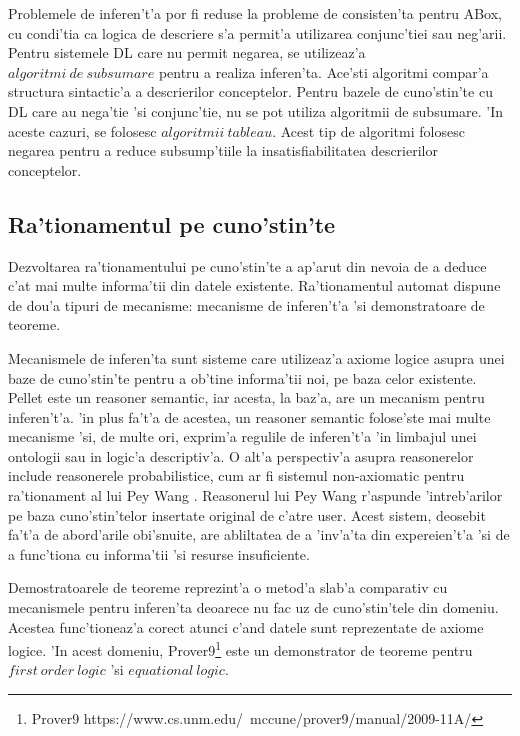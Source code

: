 \documentclass[12pt,a4paper,twoside]{report}
\begin{document}
Problemele de inferen't'a por fi reduse la probleme de consisten'ta pentru ABox, cu condi'tia ca logica de descriere s'a permit'a utilizarea conjunc'tiei sau neg'arii. Pentru sistemele DL care nu permit negarea, se utilizeaz'a $algoritmi\ de\ subsumare$ pentru a realiza inferen'ta. Ace'sti algoritmi compar'a structura sintactic'a a descrierilor conceptelor. Pentru bazele de cuno'stin'te cu DL care au nega'tie 'si conjunc'tie, nu se pot utiliza algoritmii de subsumare. 'In aceste cazuri, se folosesc $algoritmii\ tableau$. Acest tip de algoritmi folosesc negarea pentru a reduce subsump'tiile la insatisfiabilitatea descrierilor conceptelor.



\subsection{Ra'tionamentul pe cuno'stin'te}

Dezvoltarea ra'tionamentului pe cuno'stin'te a ap'arut din nevoia de a deduce c'at mai multe informa'tii din datele existente. Ra'tionamentul automat dispune de dou'a tipuri de mecanisme: mecanisme de inferen't'a 'si demonstratoare de teoreme. 

Mecanismele de inferen'ta sunt sisteme care utilizeaz'a axiome logice asupra unei baze de cuno'stin'te pentru a ob'tine informa'tii noi, pe baza celor existente. Pellet\cite{SirinPellet:Reasoner} este un reasoner semantic, iar acesta, la baz'a, are un mecanism pentru inferen't'a. 'in plus fa't'a de acestea, un reasoner semantic folose'ste mai multe mecanisme 'si, de multe ori, exprim'a regulile de inferen't'a 'in limbajul unei ontologii sau in logic'a descriptiv'a. O alt'a perspectiv'a asupra reasonerelor include reasonerele probabilistice, cum ar fi sistemul non-axiomatic pentru ra'tionament al lui Pey Wang \cite{nonaxiomaticreasoner}. Reasonerul lui Pey Wang r'aspunde 'intreb'arilor pe baza cuno'stin'telor insertate original de c'atre user. Acest sistem, deosebit fa't'a de abord'arile obi'snuite, are abliltatea de a 'inv'a'ta din expereien't'a 'si de a func'tiona cu informa'tii 'si resurse insuficiente.

Demostratoarele de teoreme reprezint'a o metod'a slab'a comparativ cu mecanismele pentru inferen'ta deoarece nu fac uz de cuno'stin'tele din domeniu. Acestea func'tioneaz'a corect atunci c'and datele sunt reprezentate de axiome logice. 'In acest domeniu, Prover9\footnote{Prover9 https://www.cs.unm.edu/~mccune/prover9/manual/2009-11A/} este un demonstrator de teoreme pentru $first\ order\ logic$ 'si $equational\ logic$.
\end{document}
